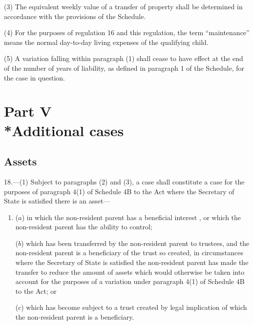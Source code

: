 \documentclass[12pt,a4paper]{article}
\begin{document}
(3) The equivalent weekly value of a transfer of property shall be determined in accordance with the provisions of the Schedule.

(4) For the purposes of regulation 16 and this regulation, the term “maintenance” means the normal day-to-day living expenses of the qualifying child.

(5) A variation falling within paragraph (1) shall cease to have effect at the end of the number of years of liability, as defined in paragraph 1 of the Schedule, for the case in question.

\section[Part V --- Additional cases]{Part V\\*Additional cases}

\subsection[18. Assets]{Assets}

\renewcommand\parthead{--- Part V}

18.---(1)  Subject to paragraphs (2) and (3), a case shall constitute a case for the purposes of paragraph 4(1) of Schedule 4B to the Act where the Secretary of State is satisfied there is an asset—
\begin{enumerate}\item[]
($a$) in which the non-resident parent 
has a beneficial interest%
, or which the non-resident parent has the ability to control;

($b$) which has been transferred by the non-resident parent to trustees, and the non-resident parent is a beneficiary of the trust so created, in circumstances where the Secretary of State is satisfied the non-resident parent has made the transfer to reduce the amount of assets which would otherwise be taken into account for the purposes of a variation under paragraph 4(1) of Schedule 4B to the Act; or

($c$) which has become subject to a trust created by legal implication of which the non-resident parent is a beneficiary.
\end{enumerate}
\end{document}
